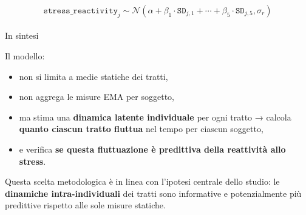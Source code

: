 \documentclass[
  11pt,
  a4paper,
  onecolumn]{article}
\makeatletter
\let\oldparagraph\paragraph
\renewcommand{\paragraph}{
    \@ifstar
      \xxxParagraphStar
      \xxxParagraphNoStar
  }
\newcommand{\xxxParagraphStar}[1]{\oldparagraph*{#1}\mbox{}}
\newcommand{\xxxParagraphNoStar}[1]{\oldparagraph{#1}\mbox{}}
\providecommand{\tightlist}{%
  \setlength{\itemsep}{0pt}\setlength{\parskip}{0pt}}
\makeatother
\begin{document}
\[
\texttt{stress\_reactivity}_j \sim \mathcal{N}(\alpha + \beta_1 \cdot \texttt{SD}_{j,1} + \cdots + \beta_5 \cdot \texttt{SD}_{j,5}, \sigma_r)
\]

\paragraph{In sintesi}\label{in-sintesi}

Il modello:

\begin{itemize}
\tightlist
\item
  non si limita a medie statiche dei tratti,
\item
  non aggrega le misure EMA per soggetto,
\item
  ma stima una \textbf{dinamica latente individuale} per ogni tratto →
  calcola \textbf{quanto ciascun tratto fluttua} nel tempo per ciascun
  soggetto,
\item
  e verifica \textbf{se questa fluttuazione è predittiva della
  reattività allo stress}.
\end{itemize}

Questa scelta metodologica è in linea con l'ipotesi centrale dello
studio: le \textbf{dinamiche intra-individuali} dei tratti sono
informative e potenzialmente più predittive rispetto alle sole misure
statiche.
\end{document}

